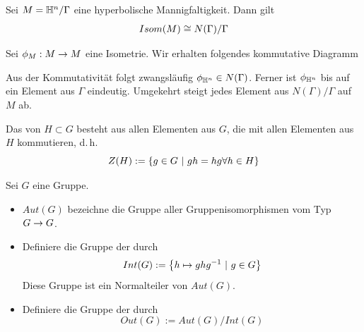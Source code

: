 \documentclass{book}
\begin{document}
\Prop{}
Sei $M = \mathbb{H}^n / \Gamma$ eine hyperbolische Mannigfaltigkeit. Dann gilt
\[ Isom(M) \overset{}{\cong} N(\Gamma) / \Gamma \]
\begin{Beweis}{}
	Sei $\phi_M : M \overset{}{\rightarrow} M$ eine Isometrie. Wir erhalten folgendes kommutative Diagramm
		\begin{center}
	\end{center}
Aus der Kommutativität folgt zwangsläufig $\phi_{\mathbb{H}^n} \in N(\Gamma)$. Ferner ist $\phi_{\mathbb{H}^n}$ bis auf ein Element aus $\Gamma$ eindeutig. Umgekehrt steigt jedes Element aus $N(\Gamma)/\Gamma$ auf $M$ ab. 
\end{Beweis}

\Def{}
Das  von $H\subset G$ besteht aus allen Elementen aus $G$, die mit allen Elementen aus $H$ kommutieren, d.\,h.
\[ Z(H) := \set{g \in G}{gh = hg \forall h \in H} \]



\Def{}
Sei $G$ eine Gruppe.
\begin{itemize}
	\item $Aut(G)$ bezeichne die Gruppe aller Gruppenisomorphismen vom Typ $G\overset{}{\rightarrow} G$.
	\item Definiere die Gruppe der  durch
	\[ Int(G) := \set{h \mapsto ghg\i}{g \in G} \]
	Diese Gruppe ist ein Normalteiler von $Aut(G)$.
	\item Definiere die Gruppe der  durch
	\[ Out(G) := Aut(G) / Int(G) \]
\end{itemize}
\end{document}
